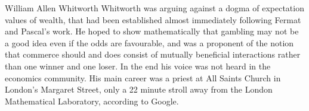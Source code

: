 \begin{history}{William Allen Whitworth}
Whitworth was arguing against a dogma of expectation values of wealth, that had 
been established almost immediately following Fermat and Pascal's work. He 
hoped to show mathematically that gambling may not be a good idea even if 
the odds are favourable, and was a 
proponent of the notion that commerce should and does
consist of mutually beneficial interactions rather than one winner and one loser. 
In the end his voice was not heard in the economics community. His main career was a priest at All Saints Church in London's Margaret Street, only a 22 minute stroll away from the London 
Mathematical Laboratory, according to Google.
%
%
\end{history}

